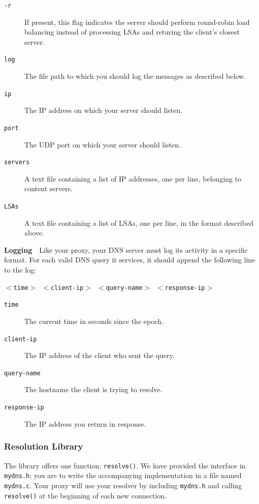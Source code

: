 \documentclass{article}
\begin{document}
\begin{description}
	\item[\texttt{-r}] If present, this flag indicates the server should
	perform round-robin load balancing instead of processing LSAs and returing
	the client's closest server.
	\item[\texttt{log}] The file path to which you should log the messages
	as described below.
	\item[\texttt{ip}] The IP address on which your server should listen.
	\item[\texttt{port}] The UDP port on which your server should listen.
	\item[\texttt{servers}] A text file containing a list of IP addresses, one
	per line, belonging to content servers.
	\item[\texttt{LSAs}] A text file containing a list of LSAs, one per line,
	in the format described above.
\end{description}

\bigskip \noindent \textbf{Logging}~~Like your proxy, your DNS server must log
its activity in a specific format.  For each valid DNS query it services, it
should append the following line to the log:
\begin{center}
	\texttt{$<$time$>$ $<$client-ip$>$ $<$query-name$>$ $<$response-ip$>$}
\end{center}

\begin{description}
	\item[\texttt{time}] The current time in seconds since the epoch.
	\item[\texttt{client-ip}] The IP address of the client who sent the query.
	\item[\texttt{query-name}] The hostname the client is trying to resolve.
	\item[\texttt{response-ip}] The IP address you return in response.
\end{description}



\subsubsection{Resolution Library}
The library offers one function: \texttt{resolve()}. We have provided the
interface in \texttt{mydns.h}; you are to write the accompanying implementation
in a file named \texttt{mydns.c}. Your proxy will use your resolver by
including \texttt{mydns.h} and calling \texttt{resolve()} at the beginning of
each new connection.
\end{document}
